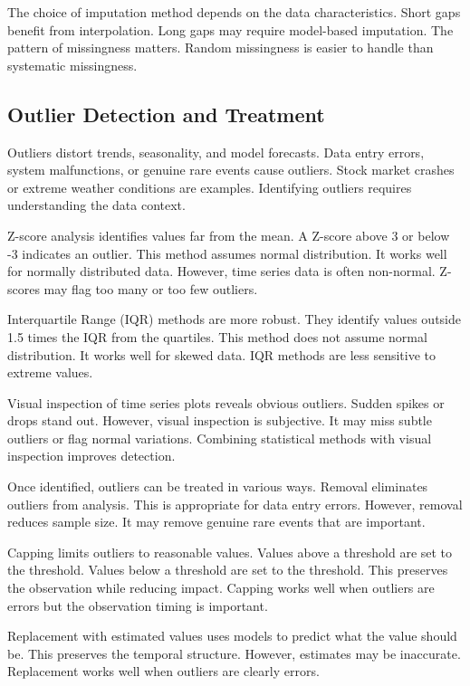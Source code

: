 The choice of imputation method depends on the data characteristics. Short gaps benefit from interpolation. Long gaps may require model-based imputation. The pattern of missingness matters. Random missingness is easier to handle than systematic missingness.

\subsection{Outlier Detection and Treatment}

Outliers distort trends, seasonality, and model forecasts. Data entry errors, system malfunctions, or genuine rare events cause outliers. Stock market crashes or extreme weather conditions are examples. Identifying outliers requires understanding the data context.

Z-score analysis identifies values far from the mean. A Z-score above 3 or below -3 indicates an outlier. This method assumes normal distribution. It works well for normally distributed data. However, time series data is often non-normal. Z-scores may flag too many or too few outliers.

Interquartile Range (IQR) methods are more robust. They identify values outside 1.5 times the IQR from the quartiles. This method does not assume normal distribution. It works well for skewed data. IQR methods are less sensitive to extreme values.

Visual inspection of time series plots reveals obvious outliers. Sudden spikes or drops stand out. However, visual inspection is subjective. It may miss subtle outliers or flag normal variations. Combining statistical methods with visual inspection improves detection.

Once identified, outliers can be treated in various ways. Removal eliminates outliers from analysis. This is appropriate for data entry errors. However, removal reduces sample size. It may remove genuine rare events that are important.

Capping limits outliers to reasonable values. Values above a threshold are set to the threshold. Values below a threshold are set to the threshold. This preserves the observation while reducing impact. Capping works well when outliers are errors but the observation timing is important.

Replacement with estimated values uses models to predict what the value should be. This preserves the temporal structure. However, estimates may be inaccurate. Replacement works well when outliers are clearly errors.


